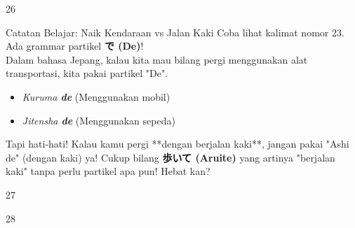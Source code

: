 \begin{convobox}{26}
    \noindent
      
      

    \vspace{1.5em}
\end{convobox}

\begin{lessonbox}{Catatan Belajar: Naik Kendaraan vs Jalan Kaki}
    Coba lihat kalimat nomor 23. Ada grammar partikel \textbf{で (De)}!\\
    Dalam bahasa Jepang, kalau kita mau bilang pergi menggunakan alat transportasi, kita pakai partikel "De". 
    \begin{itemize}
        \item \textit{Kuruma \textbf{de}} (Menggunakan mobil)
        \item \textit{Jitensha \textbf{de}} (Menggunakan sepeda)
    \end{itemize}
    Tapi hati-hati! Kalau kamu pergi **dengan berjalan kaki**, jangan pakai "Ashi de" (dengan kaki) ya! Cukup bilang \textbf{歩いて (Aruite)} yang artinya "berjalan kaki" tanpa perlu partikel apa pun! Hebat kan?
\end{lessonbox}

\begin{convobox}{27}
    \noindent
      

    \vspace{1.5em}
\end{convobox}

\begin{convobox}{28}
    \noindent
      
      

    \vspace{1.5em}
\end{convobox}


